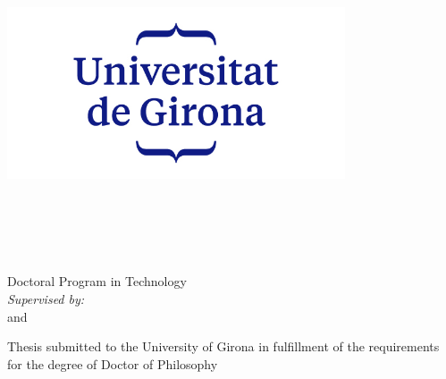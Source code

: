 \begin{titlepage}
    \begin{center}
        \large  

		\hfill
		\vfill
		
		\includegraphics[width=10cm]{0_frontmatter/figures/udg_logo} \\ \medskip
	
        \hfill


		\myDegree \\ \bigskip
		
        \begingroup
            \color{Maroon}\spacedallcaps{\myTitle} \\ \bigskip
        \endgroup

        \spacedlowsmallcaps{\myName}

        \vfill

        \myTime \\ \medskip
        Doctoral Program in Technology\\ \bigskip
        \textit{Supervised by:}\\
        
        \mySupervisor and \myOtherSupervisor \\ \bigskip
        
        Thesis submitted to the University of Girona in fulfillment of the
        requirements for the degree of Doctor of Philosophy


        \vfill                      

    \end{center}  
\end{titlepage}   

